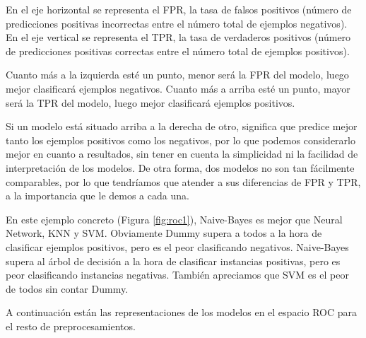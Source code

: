 \documentclass[oneside]{book}
\begin{document}
En el eje horizontal se representa el FPR, la tasa de falsos positivos
(número de predicciones positivas incorrectas entre el número total de
ejemplos negativos). En el eje vertical se representa el TPR, la tasa
de verdaderos positivos (número de predicciones positivas correctas
entre el número total de ejemplos positivos).

Cuanto más a la izquierda esté un punto, menor será la FPR del modelo,
luego mejor clasificará ejemplos negativos. Cuanto más a arriba esté
un punto, mayor será la TPR del modelo, luego mejor clasificará
ejemplos positivos.

Si un modelo está situado arriba a la derecha de otro, significa que
predice mejor tanto los ejemplos positivos como los negativos, por lo
que podemos considerarlo mejor en cuanto a resultados, sin tener en
cuenta la simplicidad ni la facilidad de interpretación de los
modelos. De otra forma, dos modelos no son tan fácilmente comparables,
por lo que tendríamos que atender a sus diferencias de FPR y TPR, a la
importancia que le demos a cada una.

En este ejemplo concreto (Figura \ref{fig:roc1}), Naive-Bayes es mejor
que Neural Network, KNN y SVM. Obviamente Dummy supera a todos a la
hora de clasificar ejemplos positivos, pero es el peor clasificando
negativos. Naive-Bayes supera al árbol de decisión a la hora de
clasificar instancias positivas, pero es peor clasificando instancias
negativas. También apreciamos que SVM es el peor de todos sin contar
Dummy.

A continuación están las representaciones de los modelos en el espacio
ROC para el resto de preprocesamientos.
\end{document}
